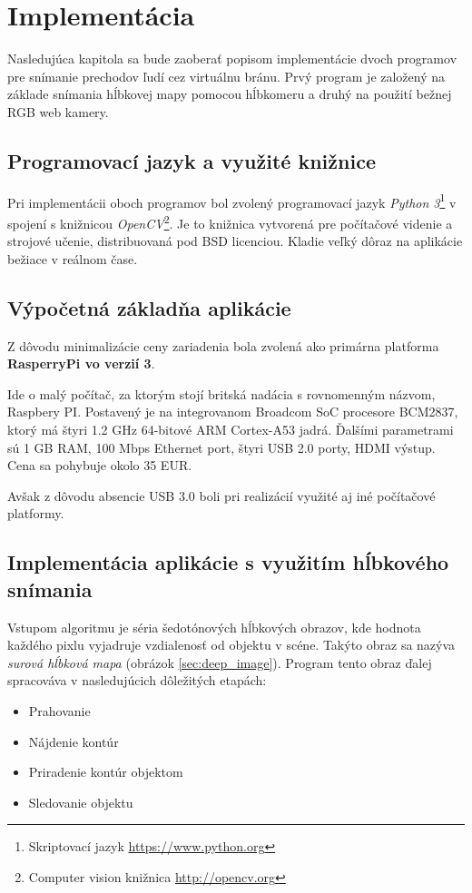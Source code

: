 \chapter{Implementácia}

Nasledujúca kapitola sa bude zaoberať popisom implementácie dvoch programov pre snímanie prechodov ľudí cez virtuálnu bránu. Prvý program je založený na základe snímania hĺbkovej mapy pomocou hĺbkomeru a druhý na použití bežnej RGB web kamery.

\section{Programovací jazyk a využité knižnice}
Pri implementácii oboch programov bol zvolený programovací jazyk \textit{Python 3}\footnote{Skriptovací jazyk \url{https://www.python.org}} v spojení s knižnicou \textit{OpenCV}\footnote{Computer vision knižnica  \url{http://opencv.org}}. Je to knižnica vytvorená pre počítačové videnie a strojové učenie, distribuovaná pod BSD licenciou. Kladie veľký dôraz na aplikácie bežiace v reálnom čase. 

\section{Výpočetná základňa aplikácie}
Z dôvodu minimalizácie ceny zariadenia bola zvolená ako primárna platforma \textbf{RasperryPi vo verzií 3}. 

Ide o malý počítač, za ktorým stojí britská nadácia s rovnomenným názvom, Raspbery PI. Postavený je na  integrovanom Broadcom SoC procesore BCM2837, ktorý má štyri 1.2 GHz 64-bitové ARM Cortex-A53 jadrá. Ďalšími parametrami sú 1 GB RAM, 100 Mbps Ethernet port, štyri USB 2.0 porty, HDMI výstup. Cena sa pohybuje okolo 35 EUR.

Avšak z dôvodu absencie USB 3.0 boli pri realizácií využité aj iné počítačové platformy.

\section{Implementácia aplikácie s využitím hĺbkového snímania}
Vstupom algoritmu je séria šedotónových hĺbkových obrazov, kde hodnota každého pixlu vyjadruje vzdialenosť od objektu v scéne. Takýto obraz sa nazýva \textit{surová hĺbková mapa} (obrázok \ref{sec:deep_image}). Program tento obraz ďalej spracováva v nasledujúcich dôležitých etapách: 

\begin{itemize}
\item Prahovanie
\item Nájdenie kontúr
\item Priradenie kontúr objektom
\item Sledovanie objektu 
\end{itemize}



